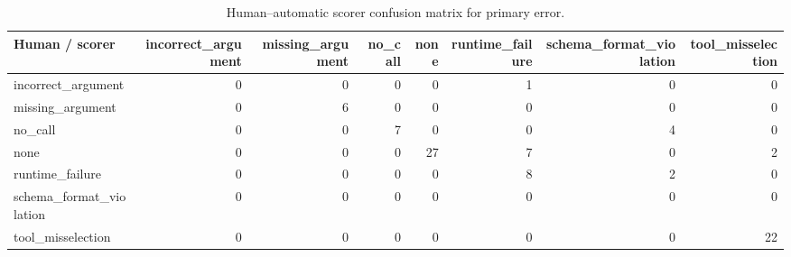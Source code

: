 \begin{table}[t]
\centering
\small
\begin{tabular}{lrrrrrrr}
\toprule
Human / scorer & incorrect\_argument & missing\_argument & no\_call & none & runtime\_failure & schema\_format\_violation & tool\_misselection \\
\midrule
incorrect\_argument & 0 & 0 & 0 & 0 & 1 & 0 & 0 \\
missing\_argument & 0 & 6 & 0 & 0 & 0 & 0 & 0 \\
no\_call & 0 & 0 & 7 & 0 & 0 & 4 & 0 \\
none & 0 & 0 & 0 & 27 & 7 & 0 & 2 \\
runtime\_failure & 0 & 0 & 0 & 0 & 8 & 2 & 0 \\
schema\_format\_violation & 0 & 0 & 0 & 0 & 0 & 0 & 0 \\
tool\_misselection & 0 & 0 & 0 & 0 & 0 & 0 & 22 \\
\bottomrule
\end{tabular}
\caption{Human--automatic scorer confusion matrix for primary error.}
\end{table}
